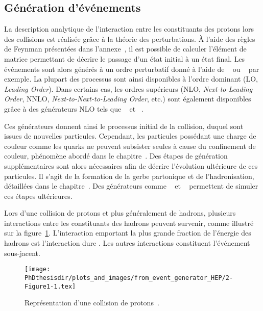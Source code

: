 \subsection{Génération d'événements}\label{chapter-LHC-section-MC-subsec-evt_gen}
La description analytique de l'interaction entre les constituants des protons lors des collisions est réalisée grâce à la théorie des perturbations.
À l'aide des règles de Feynman présentées dans l'annexe~, il est possible de calculer l'\og élément de matrice \fg{} permettant de décrire le passage d'un état initial à un état final.
Les événements sont alors générés à un ordre perturbatif donné à l'aide de
\MADGRAPH~\cite{madgraph5}
ou
\PYTHIA~\cite{pythia6.4,pythia8.2}
par exemple.
La plupart des processus sont ainsi disponibles à l'ordre dominant (LO, \emph{Leading Order}).
Dans certains cas, les ordres supérieurs (NLO, \emph{Next-to-Leading Order}, NNLO, \emph{Next-to-Next-to-Leading Order}, etc.) sont également disponibles grâce à des générateurs NLO tels que
\POWHEG~\cite{Alioli:2010xd} et
\MCATNLO~\cite{MCATNLO}.
\par Ces générateurs donnent ainsi le processus initial de la collision, duquel sont issues de nouvelles particules.
Cependant, les particules possédant une charge de couleur comme les quarks ne peuvent subsister seules à cause du confinement de couleur, phénomène abordé dans le chapitre~.
Des étapes de génération supplémentaires sont alors nécessaires afin de décrire l'évolution ultérieure de ces particules.
Il s'agit de la formation de la gerbe partonique et de l'hadronisation, détaillées dans le chapitre~.
Des générateurs comme
\PYTHIA~\cite{pythia6.4,pythia8.2} et
\HERWIG~\cite{herwig}
permettent de simuler ces étapes ultérieures.
\par Lors d'une collision de protons et plus généralement de hadrons, plusieurs interactions entre les constituants des hadrons peuvent survenir, comme illustré sur la figure~\ref{fig-event_generator_HEP-2-Figure1-1}.
L'interaction emportant la plus grande fraction de l'énergie des hadrons est l'\og interaction dure \fg{}.
Les autres interactions constituent l'événement sous-jacent.
\begin{figure}[h]
\centering
\texttt{[image: \\PhDthesisdir/plots\_and\_images/from\_event\_generator\_HEP/2-Figure1-1.tex]}
\caption[Représentation d'une collision de protons.]{Représentation d'une collision de protons~\cite{event_generator_HEP}.}
\label{fig-event_generator_HEP-2-Figure1-1}
\end{figure}
